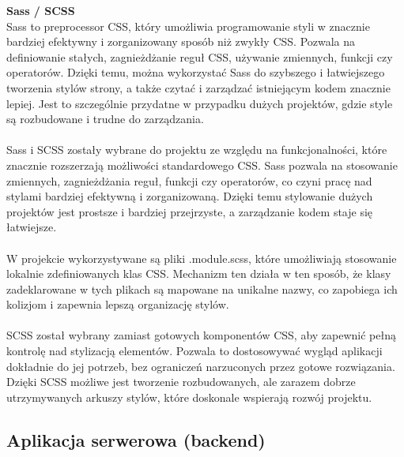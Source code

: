 \documentclass[12pt,a4paper]{article}
\begin{document}
\noindent \textbf{Sass / SCSS}\\
Sass to preprocessor CSS, który umożliwia programowanie styli w znacznie bardziej efektywny i zorganizowany sposób niż zwykły CSS. Pozwala na definiowanie stałych, zagnieżdżanie reguł CSS, używanie zmiennych, funkcji czy operatorów. Dzięki temu, można wykorzystać Sass do szybszego i łatwiejszego tworzenia stylów strony, a także czytać i zarządzać istniejącym kodem znacznie lepiej. Jest to szczególnie przydatne w przypadku dużych projektów, gdzie style są rozbudowane i trudne do zarządzania.
\\\\
Sass i SCSS zostały wybrane do projektu ze względu na funkcjonalności, które znacznie rozszerzają możliwości standardowego CSS. Sass pozwala na stosowanie zmiennych, zagnieżdżania reguł, funkcji czy operatorów, co czyni pracę nad stylami bardziej efektywną i zorganizowaną. Dzięki temu stylowanie dużych projektów jest prostsze i bardziej przejrzyste, a zarządzanie kodem staje się łatwiejsze.
\\\\
W projekcie wykorzystywane są pliki .module.scss, które umożliwiają stosowanie lokalnie zdefiniowanych klas CSS. Mechanizm ten działa w ten sposób, że klasy zadeklarowane w tych plikach są mapowane na unikalne nazwy, co zapobiega ich kolizjom i zapewnia lepszą organizację stylów.
\\\\
SCSS został wybrany zamiast gotowych komponentów CSS, aby zapewnić pełną kontrolę nad stylizacją elementów. Pozwala to dostosowywać wygląd aplikacji dokładnie do jej potrzeb, bez ograniczeń narzuconych przez gotowe rozwiązania. Dzięki SCSS możliwe jest tworzenie rozbudowanych, ale zarazem dobrze utrzymywanych arkuszy stylów, które doskonale wspierają rozwój projektu.

\subsection{Aplikacja serwerowa (backend)}
\end{document}
